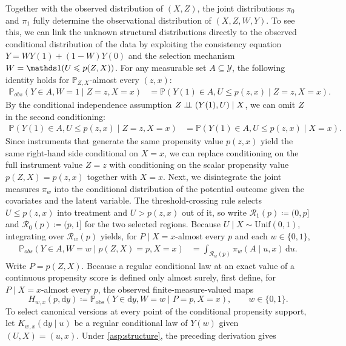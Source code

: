 Together with the observed distribution of $(X,Z)$, the joint distributions $\pi_0$ and $\pi_1$ fully determine the observational distribution of $(X,Z,W,Y)$. To see this, we can link the unknown structural distributions directly to the observed conditional distribution of the data by exploiting the consistency equation $Y = W Y(1) + (1-W) Y(0)$ and the selection mechanism $W = \indicator(U \leqslant p(Z,X))$. For any measurable set $A \subseteq \mathcal{Y}$, the following identity holds for $\mathbb P_{Z,X}$-almost every $(z,x)$:
\begin{align*}
    \mathbb{P}_{obs}(Y \in A, W=1 \mid Z=z, X=x) &= \mathbb{P}(Y(1) \in A, U \leqslant p(z,x) \mid Z=z, X=x).
\end{align*}
By the conditional independence assumption $Z \perp\!\!\!\perp (Y(1), U) \mid X$, we can omit $Z$ in the second conditioning:
\begin{align*}
    \mathbb{P}(Y(1) \in A, U \leqslant p(z,x) \mid Z=z, X=x) &= \mathbb{P}(Y(1) \in A, U \leqslant p(z,x) \mid X=x).
\end{align*}
Since instruments that generate the same propensity value $p(z,x)$ yield the same right-hand side conditional on $X=x$, we can replace conditioning on the full instrument value $Z=z$ with conditioning on the scalar propensity value $p(Z,X)=p(z,x)$ together with $X=x$. Next, we disintegrate the joint measures $\pi_w$ into the conditional distribution of the potential outcome given the covariates and the latent variable. The threshold-crossing rule selects $U \leqslant p(z,x)$ into treatment and $U > p(z,x)$ out of it, so write $\mathcal{R}_1(p) \coloneqq (0,p]$ and $\mathcal{R}_0(p) \coloneqq (p,1]$ for the two selected regions. Because $U \mid X \sim \text{Unif}(0,1)$, integrating over $\mathcal{R}_w(p)$ yields, for $P\mid X=x$-almost every $p$ and each $w \in \{0,1\}$,
\begin{align*}
    \mathbb{P}_{obs}(Y \in A, W=w \mid p(Z,X)=p, X=x) &= \int_{\mathcal{R}_w(p)} \pi_w(A \mid u, x) \,\mathrm{d}u.
\end{align*}
Write $P=p(Z,X)$. Because a regular conditional law at an exact value of a continuous propensity score is defined only almost surely, first define, for $P\mid X=x$-almost every $p$, the observed finite-measure-valued maps
\begin{equation}\label{eq:canonical_submeasures}
    H_{w,x}(p,\mathrm{d}y)\coloneqq
    \mathbb P_{\mathrm{obs}}(Y\in\mathrm{d}y,W=w\mid P=p,X=x),
    \qquad w\in\{0,1\}.
\end{equation}
To select canonical versions at every point of the conditional propensity support, let $K_{w,x}(\mathrm{d}y\mid u)$ be a regular conditional law of $Y(w)$ given $(U,X)=(u,x)$. Under \cref{asp:structure}, the preceding derivation gives
